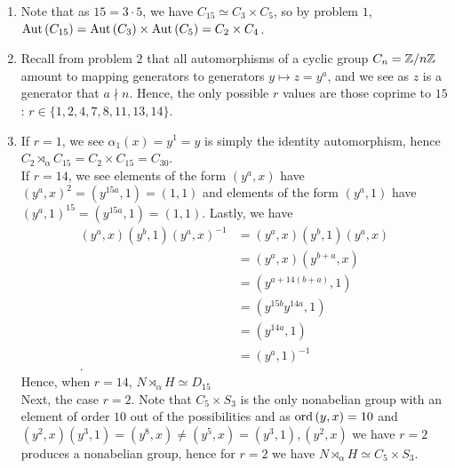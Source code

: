 \documentclass[a4paper]{article}
\begin{document}
\begin{solution}
	\begin{enumerate}
		\item Note that as \(15 = 3\cdot 5\), we have \(C_{15} \simeq C_3 \times C_5\), so by problem \(1\), \(\operatorname{Aut} \left( C_{15} \right)  = \operatorname{Aut} \left( C_3 \right) \times \operatorname{Aut} \left( C_5 \right)  = C_2 \times C_4\).
			\item Recall from problem \(2\) that all automorphisms of a cyclic group \(C_{n} = \mathbb{Z} / n\mathbb{Z}\) amount to mapping generators to generators \(y \mapsto z = y^{a}\), and we see as \(z\) is a generator that \(a \nmid n\). Hence, the only possible \(r\) values are those coprime to \(15\): \(r \in \{1, 2, 4,  7, 8, 11, 13, 14 \} \).
			\item If \(r = 1\), we see \(\alpha_1 \left( x \right)  = y^{1} = y\) is simply the identity automorphism, hence \(C_2 \rtimes_{\alpha} C_{15} = C_2 \times C_{15} = C_{30}\).\\
				If \(r = 14\), we see elements of the form \(\left( y^{a}, x \right) \) have \(\left( y^{a}, x \right) ^2 = \left( y^{15a}, 1 \right) = \left( 1, 1 \right)  \) and elements of the form \(\left( y^{a}, 1 \right) \) have \(\left( y^{a}, 1 \right) ^{15} = \left( y^{15a}, 1 \right)  = \left( 1, 1 \right) \). Lastly, we have
				\begin{align*}
					\left( y^{a}, x \right) \left( y^{b}, 1 \right) \left( y^{a}, x \right) ^{-1} &=  \left( y^{a}, x \right) \left( y^{b}, 1 \right)\left( y^{a}, x \right)    \\
														      &= \left( y^{a}, x \right)\left( y^{b + a}, x\right)   \\
														      &= \left( y^{a + 14\left( b + a \right)},1 \right)  \\
														      &= \left( y^{15b}y^{14a}, 1 \right)\\
														      &= \left( y^{14a}, 1 \right)  \\
														      &= \left( y^{a}, 1 \right)^{-1}  \\
				.\end{align*}
				Hence, when \(r = 14\), \( N \rtimes_{\alpha} H \simeq D_{15}\)\\

				Next, the case \(r = 2\). Note that \(C_5 \times S_3\) is the only nonabelian group with an element of order \(10\) out of the possibilities and as \(\operatorname{ord}\left( y, x \right) = 10 \) and \(\left( y^2, x \right) \left( y^3, 1 \right)  = \left( y^{8}, x \right) \neq \left( y^{5}, x \right)  = \left( y^3,1 \right), \left( y^2, x \right)   \) we have \(r = 2\) produces a nonabelian group, hence for \(r = 2\) we have \(N \rtimes_{\alpha} H \simeq C_5 \times S_3\).\\


\end{enumerate}
\end{solution}
\end{document}
